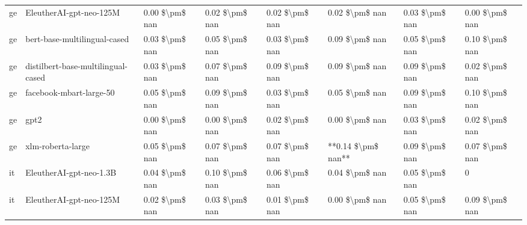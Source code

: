 \begin{tabular}{llllllll}
      ge &            EleutherAI-gpt-neo-125M & 0.00 \$\textbackslash pm\$ nan &            0.02 \$\textbackslash pm\$ nan &        0.02 \$\textbackslash pm\$ nan &         0.02 \$\textbackslash pm\$ nan &                          0.03 \$\textbackslash pm\$ nan &     0.00 \$\textbackslash pm\$ nan \\
      ge &       bert-base-multilingual-cased & 0.03 \$\textbackslash pm\$ nan &            0.05 \$\textbackslash pm\$ nan &        0.03 \$\textbackslash pm\$ nan &         0.09 \$\textbackslash pm\$ nan &                          0.05 \$\textbackslash pm\$ nan &     0.10 \$\textbackslash pm\$ nan \\
      ge & distilbert-base-multilingual-cased & 0.03 \$\textbackslash pm\$ nan &            0.07 \$\textbackslash pm\$ nan &        0.09 \$\textbackslash pm\$ nan &         0.09 \$\textbackslash pm\$ nan &                          0.09 \$\textbackslash pm\$ nan &     0.02 \$\textbackslash pm\$ nan \\
      ge &            facebook-mbart-large-50 & 0.05 \$\textbackslash pm\$ nan &            0.09 \$\textbackslash pm\$ nan &        0.03 \$\textbackslash pm\$ nan &         0.05 \$\textbackslash pm\$ nan &                          0.09 \$\textbackslash pm\$ nan &     0.10 \$\textbackslash pm\$ nan \\
      ge &                               gpt2 & 0.00 \$\textbackslash pm\$ nan &            0.00 \$\textbackslash pm\$ nan &        0.02 \$\textbackslash pm\$ nan &         0.00 \$\textbackslash pm\$ nan &                          0.03 \$\textbackslash pm\$ nan &     0.02 \$\textbackslash pm\$ nan \\
      ge &                  xlm-roberta-large & 0.05 \$\textbackslash pm\$ nan &            0.07 \$\textbackslash pm\$ nan &        0.07 \$\textbackslash pm\$ nan &     **0.14 \$\textbackslash pm\$ nan** &                          0.09 \$\textbackslash pm\$ nan &     0.07 \$\textbackslash pm\$ nan \\
      it &            EleutherAI-gpt-neo-1.3B & 0.04 \$\textbackslash pm\$ nan &            0.10 \$\textbackslash pm\$ nan &        0.06 \$\textbackslash pm\$ nan &         0.04 \$\textbackslash pm\$ nan &                          0.05 \$\textbackslash pm\$ nan &                  0 \\
      it &            EleutherAI-gpt-neo-125M & 0.02 \$\textbackslash pm\$ nan &            0.03 \$\textbackslash pm\$ nan &        0.01 \$\textbackslash pm\$ nan &         0.00 \$\textbackslash pm\$ nan &                          0.05 \$\textbackslash pm\$ nan &     0.09 \$\textbackslash pm\$ nan \\

\end{tabular}
